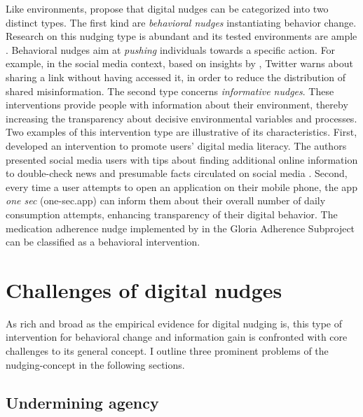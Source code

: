 \documentclass[reflection, authordate]{jote-new-article}
\begin{document}
Like environments, \textcite{Grüning2022a} propose that digital nudges can be categorized into two distinct types. The first kind are \emph{behavioral nudges} instantiating behavior change. Research on this nudging type is abundant and its tested environments are ample \parencites[see e.g.][]{Daley2018}{Glanz2017}{Pennycook2021}{Voelkel2021}. Behavioral nudges aim at \emph{pushing }individuals towards a specific action. For example, in the social media context, based on insights by \textcite{Pennycook2021}, Twitter warns about sharing a link without having accessed it, in order to reduce the distribution of shared misinformation. The second type concerns \emph{informative nudges}. These interventions provide people with information about their environment, thereby increasing the transparency about decisive environmental variables and processes. Two examples of this intervention type are illustrative of its characteristics. First, \textcite{Guess2020} developed an intervention to promote users’ digital media literacy. The authors presented social media users with tips about finding additional online information to double-check news and presumable facts circulated on social media \parencites[see a review of the intervention, Prosocial Design][]{NetworkND}. Second, every time a user attempts to open an application on their mobile phone, the app \emph{one sec }(one-sec.app) can inform them about their overall number of daily consumption attempts, enhancing transparency of their digital behavior. The medication adherence nudge implemented by \textcite{Hartman2021} in the Gloria Adherence Subproject can be classified as a behavioral intervention.



\section{Challenges of digital nudges}



As rich and broad as the empirical evidence for digital nudging is, this type of intervention for behavioral change and information gain is confronted with core challenges to its general concept. I outline three prominent problems of the nudging-concept in the following sections.



\subsection{Undermining agency}
\end{document}
